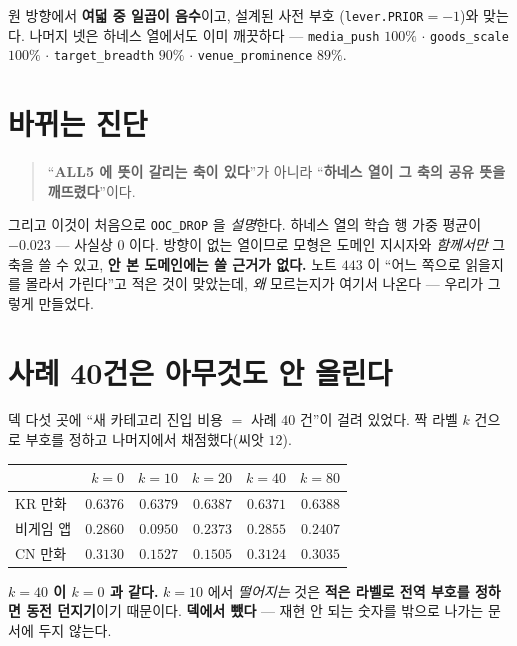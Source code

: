 \documentclass[11pt]{article}
\begin{document}
원 방향에서 \textbf{여덟 중 일곱이 음수}이고, 설계된 사전 부호
(\texttt{lever.PRIOR}$=-1$)와 맞는다. 나머지 넷은 하네스 열에서도 이미
깨끗하다 --- \texttt{media\_push} $100\%$ $\cdot$ \texttt{goods\_scale}
$100\%$ $\cdot$ \texttt{target\_breadth} $90\%$ $\cdot$
\texttt{venue\_prominence} $89\%$.

\section{바뀌는 진단}

\begin{quote}
``\textbf{ALL5 에 뜻이 갈리는 축이 있다}''가 아니라
``\textbf{하네스 열이 그 축의 공유 뜻을 깨뜨렸다}''이다.
\end{quote}

그리고 이것이 처음으로 \texttt{OOC\_DROP} 을 \emph{설명}한다. 하네스 열의
학습 행 가중 평균이 $\mathbf{-0.023}$ --- 사실상 $0$ 이다. 방향이 없는
열이므로 모형은 도메인 지시자와 \emph{함께서만} 그 축을 쓸 수 있고,
\textbf{안 본 도메인에는 쓸 근거가 없다.} 노트 $443$ 이 ``어느 쪽으로
읽을지를 몰라서 가린다''고 적은 것이 맞았는데, \emph{왜} 모르는지가
여기서 나온다 --- 우리가 그렇게 만들었다.

\section{사례 40건은 아무것도 안 올린다}

덱 다섯 곳에 ``새 카테고리 진입 비용 $=$ 사례 $40$ 건''이 걸려 있었다.
짝 라벨 $k$ 건으로 부호를 정하고 나머지에서 채점했다(씨앗 $12$).

\begin{center}
\begin{tabular}{lrrrrr}
\hline
 & $k{=}0$ & $k{=}10$ & $k{=}20$ & $k{=}40$ & $k{=}80$ \\
\hline
KR 만화 & $0.6376$ & $0.6379$ & $0.6387$ & $0.6371$ & $0.6388$ \\
비게임 앱 & $0.2860$ & $\mathbf{0.0950}$ & $0.2373$ & $0.2855$ & $0.2407$ \\
CN 만화 & $0.3130$ & $\mathbf{0.1527}$ & $0.1505$ & $0.3124$ & $0.3035$ \\
\hline
\end{tabular}
\end{center}

\textbf{$k{=}40$ 이 $k{=}0$ 과 같다.} $k{=}10$ 에서 \emph{떨어지는} 것은
\textbf{적은 라벨로 전역 부호를 정하면 동전 던지기}이기 때문이다.
\textbf{덱에서 뺐다} --- 재현 안 되는 숫자를 밖으로 나가는 문서에 두지
않는다.
\end{document}
